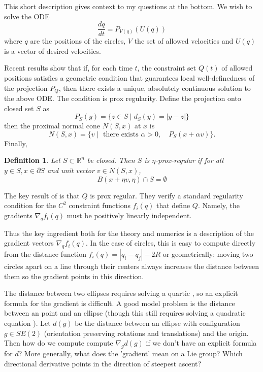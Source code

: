 \documentclass{article}
\newtheorem{definition}[theorem]{Definition}
\newcommand\abs[1]{\left|#1\right|}
\begin{document}
This short description gives context to my questions at the bottom. We wish to solve the ODE
\[
\frac{dq}{dt} = P_{V(q)}(U(q))
\]
where $q$ are the positions of the circles, $V$ the set of allowed velocities and $U(q)$ is a vector of desired velocities.

Recent results show that \cite{edmond2005relaxation} if, for each time $t$, the constraint set $Q(t)$ of allowed positions satisfies a geometric condition that guarantees local well-definedness of the projection $P_Q$, then there exists a unique, absolutely continuous solution to the above ODE.  The condition is prox regularity. Define the projection onto closed set $S$ as
\[
	P_S(y) = \{ z \in S \mid d_S(y) = \abs{y - z} \}
\]
then the proximal normal cone $N(S, x)$ at $x$ is 
\[
	N(S, x) = \{ v \mid \textrm{ there exists } \alpha > 0, \quad P_S(x + \alpha v) \}.
\]
Finally,
\begin{definition}
	Let $S \subset \mathbb{R}^n$ be closed. Then $S$ is $\eta$-prox-regular if for all $y \in S, x \in \partial S$ and unit vector $v \in N(S, x)$,
\[
	B(x + \eta v, \eta) \cap S = \emptyset	
\]
\end{definition}

The key result of \cite{maury2011discrete} is that $Q$ is prox regular. They verify a standard regularity condition for the $C^2$ constraint functions $f_i(q)$ that define $Q$. Namely, the gradients $\nabla_q f_i(q)$ must be positively linearly independent. 

Thus the key ingredient both for the theory and numerics is a description of the gradient vectors $\nabla_q f_i(q)$. In the case of circles, this is easy to compute directly from the distance function $f_i(q) = \abs{q_i - q_j} - 2R$ or geometrically: moving two circles apart on a line through their centers always increases the distance between them so the gradient points in this direction.

The distance between two ellipses requires solving a quartic \cite{choi2006continuous}, so an explicit formula for the gradient is difficult. A good model problem is the distance between an point and an ellipse (though this still requires solving a quadratic equation \cite{maisonobe2003}). Let $d(g)$ be the distance between an ellipse with configuration $g \in SE(2)$ (orientation preserving rotations and translations) and the origin. Then how do we compute compute $\nabla_g d(g)$ if we don't have an explicit formula for $d$? More generally, what does the 'gradient' mean on a Lie group? Which directional derivative points in the direction of steepest ascent?



\end{document}
